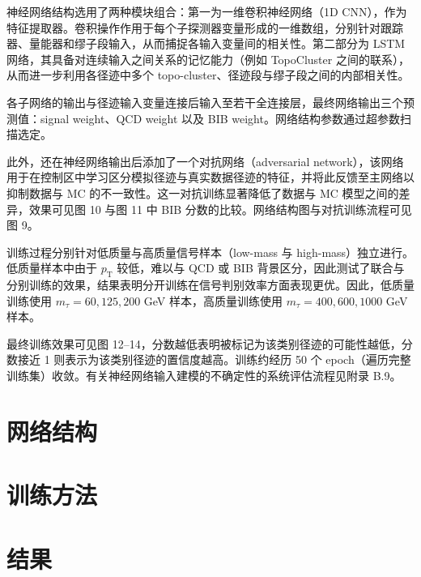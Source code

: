 神经网络结构选用了两种模块组合：第一为一维卷积神经网络（1D CNN），作为特征提取器。卷积操作作用于每个子探测器变量形成的一维数组，分别针对跟踪器、量能器和缪子段输入，从而捕捉各输入变量间的相关性。第二部分为 LSTM 网络，其具备对连续输入之间关系的记忆能力（例如 TopoCluster 之间的联系），从而进一步利用各径迹中多个 topo-cluster、径迹段与缪子段之间的内部相关性。

各子网络的输出与径迹输入变量连接后输入至若干全连接层，最终网络输出三个预测值：signal weight、QCD weight 以及 BIB weight。网络结构参数通过超参数扫描选定。

此外，还在神经网络输出后添加了一个对抗网络（adversarial network），该网络用于在控制区中学习区分模拟径迹与真实数据径迹的特征，并将此反馈至主网络以抑制数据与 MC 的不一致性。这一对抗训练显著降低了数据与 MC 模型之间的差异，效果可见图 10 与图 11 中 BIB 分数的比较。网络结构图与对抗训练流程可见图 9。

训练过程分别针对低质量与高质量信号样本（low-mass 与 high-mass）独立进行。低质量样本中由于 $p_{\mathrm{T}}$ 较低，难以与 QCD 或 BIB 背景区分，因此测试了联合与分别训练的效果，结果表明分开训练在信号判别效率方面表现更优。因此，低质量训练使用 $m_\tau = 60, 125, 200$ GeV 样本，高质量训练使用 $m_\tau = 400, 600, 1000$ GeV 样本。

最终训练效果可见图 12--14，分数越低表明被标记为该类别径迹的可能性越低，分数接近 1 则表示为该类别径迹的置信度越高。训练约经历 50 个 epoch（遍历完整训练集）收敛。有关神经网络输入建模的不确定性的系统评估流程见附录 B.9。

\section{网络结构}

\section{训练方法}

\section{结果}

